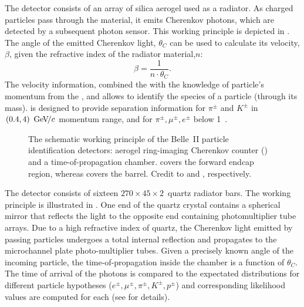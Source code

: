 The \ARICH detector \cite{Yusa:2014tua} consists of an array of silica aerogel used as a radiator.
As charged particles pass through the material, it emits Cherenkov photons, which are detected by a subsequent photon sensor.
This working principle is depicted in .
The angle of the emitted Cherenkov light, $\theta_C$ can be used to calculate its velocity, $\beta$, given the refractive index of the radiator material,$n$:
\begin{equation}
    \beta = \frac{1}{n\cdot\theta_C}.
\end{equation}
The velocity information, combined the with the knowledge of particle's momentum from the \CDC, \SVD and \PXD allows to identify the species of a particle (through its mass).
\ARICH is designed to provide separation information for $\pi^{\pm}$ and $K^{\pm}$ in $(0.4,4)~{\mathrm{\,Ge\kern -0.1em V\!/}c}$ momentum range, and for $\pi^{\pm},\mu^{\pm},e^{\pm}$ below 1~\gevc.

\begin{figure}[htbp!]
    \centering
    \caption{\label{fig:pid}
    The schematic working principle of the Belle~II particle identification detectors: aerogel ring-imaging Cherenkov counter () and a time-of-propagation chamber.
    \ARICH covers the forward endcap region, whereas \TOP covers the barrel.
    Credit to \cite{Yusa:2014tua} and \cite{Fast:2017pff}, respectively.
    }
\end{figure}

The \TOP detector \cite{Fast:2017pff} consists of sixteen $270 \times 45 \times 2$~\cm quartz radiator bars.
The working principle is illustrated in .
One end of the quartz crystal contains a spherical mirror that reflects the light to the opposite end containing photomultiplier tube arrays.
Due to a high refractive index of quartz, the Cherenkov light emitted by passing particles undergoes a total internal reflection and propagates to the
microchannel plate photo-multiplier tubes.
Given a precisely known angle of the incoming particle, the time-of-propagation inside the chamber is a function of $\theta_C$.
The time of arrival of the photons is compared to the expectated distributions for different particle hypotheses ($e^{\pm},\mu^{\pm},\pi^{\pm},K^{\pm},p^{\pm}$) and corresponding likelihood values are computed for each (see \cite{Yonenaga:2020eby} for details).

